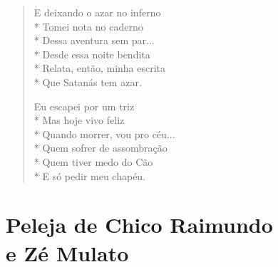 \begin{verse}
E deixando o azar no inferno\\*
Tomei nota no caderno\\*
Dessa aventura sem par...\\*
Desde essa noite bendita\\*
Relata, então, minha escrita\\*
Que Satanás tem azar.

Eu escapei por um triz\\*
Mas hoje vivo feliz\\*
Quando morrer, vou pro céu...\\*
Quem sofrer de assombração\\*
Quem tiver medo do Cão\\*
E só pedir meu chapéu.
\end{verse}

\chapter[Peleja de Chico Raimundo e Zé Mulato]{Peleja de Chico Raimundo\\ e Zé Mulato}


